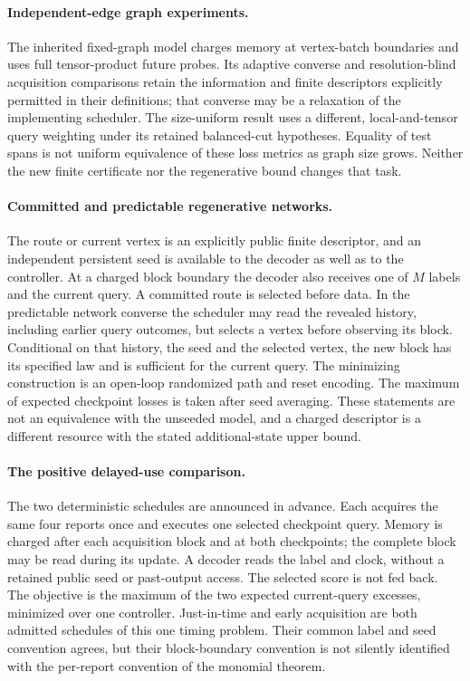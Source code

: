 \paragraph{Independent-edge graph experiments.}
The inherited fixed-graph model charges memory at vertex-batch boundaries
and uses full tensor-product future probes. Its adaptive converse and
resolution-blind acquisition comparisons retain the information and
finite descriptors explicitly permitted in their definitions; that
converse may be a relaxation of the implementing scheduler. The
size-uniform result uses a different, local-and-tensor query weighting
under its retained balanced-cut hypotheses. Equality of test spans is not
uniform equivalence of these loss metrics as graph size grows. Neither
the new finite certificate nor the regenerative bound changes that task.

\paragraph{Committed and predictable regenerative networks.}
The route or current vertex is an explicitly public finite descriptor,
and an independent persistent seed is available to the decoder as well
as to the controller. At a charged block boundary the decoder also
receives one of $M$ labels and the current query. A committed route is
selected before data. In the predictable network converse the scheduler
may read the revealed history, including earlier query outcomes, but
selects a vertex before observing its block. Conditional on that history,
the seed and the selected vertex, the new block has its specified law
and is sufficient for the current query. The minimizing construction is
an open-loop randomized path and reset encoding. The maximum of expected
checkpoint losses is taken after seed averaging. These statements are
not an equivalence with the unseeded model, and a charged descriptor is a
different resource with the stated additional-state upper bound.

\paragraph{The positive delayed-use comparison.}
The two deterministic schedules are announced in advance. Each acquires
the same four reports once and executes one selected checkpoint query.
Memory is charged after each acquisition block and at both checkpoints;
the complete block may be read during its update. A decoder reads the
label and clock, without a retained public seed or past-output access.
The selected score is not fed back. The objective is the maximum of the
two expected current-query excesses, minimized over one controller.
Just-in-time and early acquisition are both admitted schedules of this
one timing problem. Their common label and seed convention agrees, but
their block-boundary convention is not silently identified with the
per-report convention of the monomial theorem.
